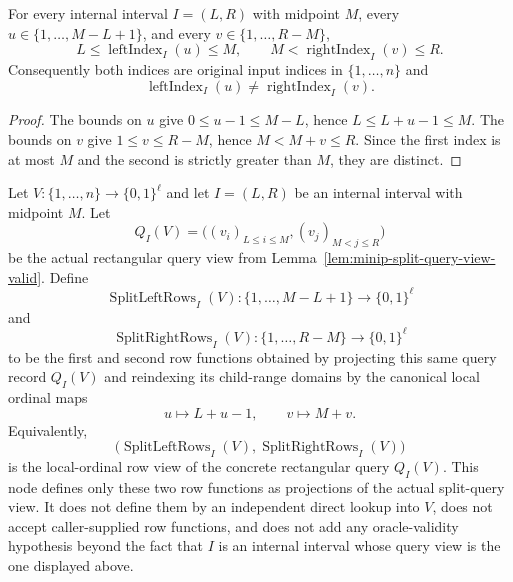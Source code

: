 \begin{lemma}
  \label{lem:minip-split-answer-affine-index-valid}
  For every internal interval $I=(L,R)$ with midpoint $M$, every
  $u\in\{1,\ldots,M-L+1\}$, and every
  $v\in\{1,\ldots,R-M\}$,
  \[
    L\leq \operatorname{leftIndex}_I(u)\leq M,
    \qquad
    M<\operatorname{rightIndex}_I(v)\leq R.
  \]
  Consequently both indices are original input indices in $\{1,\ldots,n\}$ and
  \[
    \operatorname{leftIndex}_I(u)\neq
    \operatorname{rightIndex}_I(v).
  \]
\end{lemma}
\begin{proof}
  The bounds on $u$ give $0\leq u-1\leq M-L$, hence
  $L\leq L+u-1\leq M$.  The bounds on $v$ give $1\leq v\leq R-M$, hence
  $M< M+v\leq R$.  Since the first index is at most $M$ and the second is
  strictly greater than $M$, they are distinct.
\end{proof}

\begin{definition}
  \label{def:minip-split-query-local-row-functions}
  Let $V:\{1,\ldots,n\}\to\{0,1\}^{\ell}$ and let $I=(L,R)$ be an internal
  interval with midpoint $M$.  Let
  \[
    Q_I(V)=
      \bigl((v_i)_{L\leq i\leq M},(v_j)_{M<j\leq R}\bigr)
  \]
  be the actual rectangular query view from
  Lemma~\ref{lem:minip-split-query-view-valid}.  Define
  \[
    \operatorname{SplitLeftRows}_I(V):
      \{1,\ldots,M-L+1\}\to\{0,1\}^{\ell}
  \]
  and
  \[
    \operatorname{SplitRightRows}_I(V):
      \{1,\ldots,R-M\}\to\{0,1\}^{\ell}
  \]
  to be the first and second row functions obtained by projecting this same
  query record $Q_I(V)$ and reindexing its child-range domains by the canonical
  local ordinal maps
  \[
    u\mapsto L+u-1,\qquad v\mapsto M+v.
  \]
  Equivalently,
  \[
    \bigl(\operatorname{SplitLeftRows}_I(V),
          \operatorname{SplitRightRows}_I(V)\bigr)
  \]
  is the local-ordinal row view of the concrete rectangular query
  $Q_I(V)$.  This node defines only these two row functions as projections of
  the actual split-query view.  It does not define them by an independent
  direct lookup into $V$, does not accept caller-supplied row functions, and
  does not add any oracle-validity hypothesis beyond the fact that $I$ is an
  internal interval whose query view is the one displayed above.
\end{definition}


